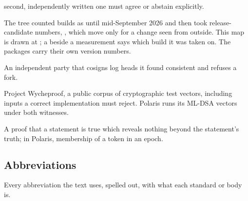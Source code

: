 \begin{description}
    second, independently written one must agree or abstain explicitly.
  \item[Version numbers.] The tree counted builds as  until mid-September 2026 and
    then took release-candidate numbers, , which move only for a change seen from
    outside. This map is drawn at ; a  beside a measurement says which
    build it was taken on. The packages carry their own version numbers.
  \item[Witness.] An independent party that cosigns log heads it found consistent and refuses a fork.
  \item[Wycheproof.] Project Wycheproof, a public corpus of cryptographic test vectors, including inputs a
    correct implementation must reject. Polaris runs its ML-DSA vectors under both witnesses.
  \item[Zero-knowledge proof.] A proof that a statement is true which reveals nothing beyond the
    statement's truth; in Polaris, membership of a token in an epoch.
\end{description}

\subsection*{Abbreviations}

Every abbreviation the text uses, spelled out, with what each standard or body is.


